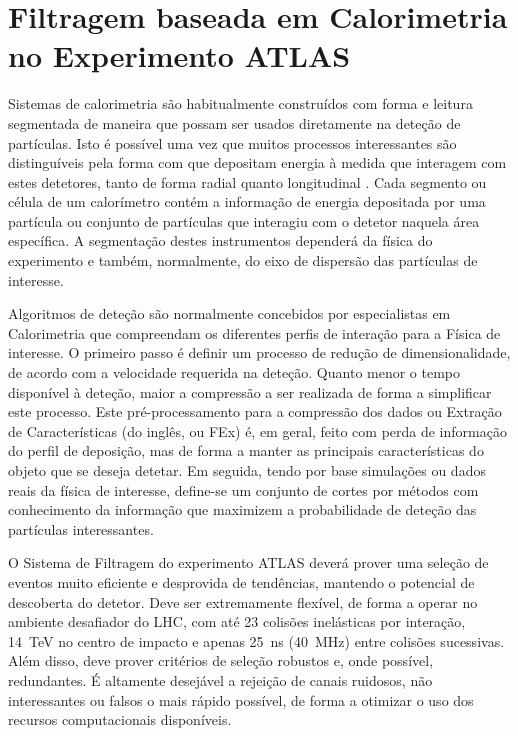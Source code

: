 \typeout{ ====================================================================}
\typeout{ ====================================================================}

\chapter{Filtragem baseada em Calorimetria no Experimento ATLAS}
\label{chap:baseline}

Sistemas de calorimetria são habitualmente construídos com forma e leitura
segmentada de maneira que possam ser usados diretamente na dete\-ção de
par\-tí\-culas. Isto é possível uma vez que muitos processos interessantes são
distinguíveis pela forma com que depositam energia à medida que interagem com
estes detetores, tanto de forma radial quanto longitudinal
\cite{wigmans-book}. Cada segmento ou célula de um calorímetro contém a
informação de energia depositada por uma par\-tí\-cula ou conjunto de
par\-tí\-culas que interagiu com o detetor naquela área espe\-cí\-fica. A
seg\-men\-ta\-ção destes instrumentos dependerá da física do experimento e
também, normalmente, do eixo de dispersão das partículas de interesse.

Algoritmos de dete\-ção são normalmente concebidos por especialistas em
Calorimetria que compreendam os diferentes perfis de intera\-ção para a
Fí\-sica de interesse. O primeiro passo é definir um processo de redu\-ção de
dimensionalidade, de acordo com a velocidade requerida na deteção. Quanto
menor o tempo disponível à deteção, maior a compressão a ser realizada de
forma a simplificar este processo. Este pré-processamento para a compressão
dos dados ou Extração de Características (do inglês, 
ou FEx) é, em geral, feito com perda de informação do perfil de deposição, mas
de forma a manter as principais características do objeto que se deseja
detetar. Em seguida, tendo por base simulações ou dados reais da física de
interesse, define-se um conjunto de cortes por métodos com conhecimento da
informação  que maximizem a probabilidade de deteção das
partículas interessantes.

O Sistema de Filtragem  do experimento ATLAS deverá prover uma
seleção de eventos muito eficiente e desprovida de tendências, mantendo o
potencial de descoberta do detetor. Deve ser extremamente flexível, de forma a
operar no ambiente desafiador do LHC, com até 23 colisões inelásticas por
interação, 14~TeV no centro de impacto e apenas 25~ns (40~MHz) entre colisões
sucessivas. Além disso, deve prover critérios de seleção robustos e, onde
possível, redundantes. É altamente desejável a rejeição de canais ruidosos,
não interessantes ou falsos o mais rápido possível, de forma a otimizar o uso
dos recursos computacionais disponíveis.

